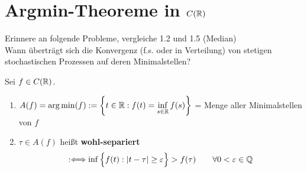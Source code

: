 
\section{Argmin-Theoreme in \texorpdfstring{$C(\mathbb{R})$}{C(R)}} %
Erinnere an folgende Probleme, vergleiche  1.2 und 1.5 (Median)\\ %
Wann überträgt sich die Konvergenz (f.s. oder in Verteilung) von stetigen stochastischen Prozessen auf deren Minimalstellen?

\begin{definition}\label{definition8.1}
	Sei $f\in C(\mathbb{R})$.
	\begin{enumerate}[label=(\arabic*)]
		\item $\begin{aligned}
			A(f)=\operatorname*{arg\,min}(f):=\left\lbrace t\in\mathbb{R}:f(t)=\inf\limits_{s\in\mathbb{R}} f(s)\right\rbrace
		\end{aligned}$ = Menge aller Minimalstellen von $f$
		\item $\tau\in A(f)$ heißt \textbf{wohl-separiert} 
		\begin{align*}
			:\Longleftrightarrow\inf\Big\lbrace f(t):|t-\tau|\geq\varepsilon\Big\rbrace>f(\tau)\qquad\forall 0<\varepsilon\in\mathbb{Q}
		\end{align*}
	\end{enumerate}
\end{definition}

